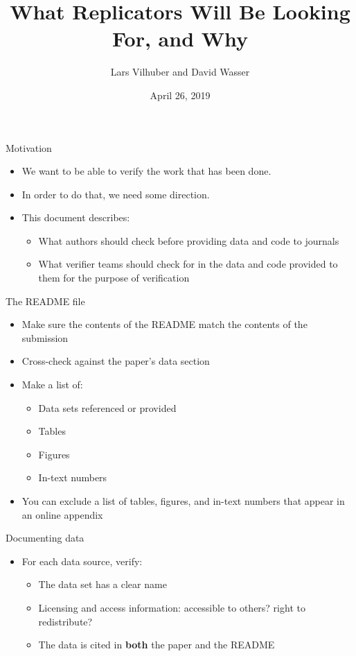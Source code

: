 \documentclass[xcolor={dvipsnames}]{beamer}
\title[Verification Guidance]{What Replicators Will Be Looking For, and Why}
\author{Lars Vilhuber and David Wasser}
\date{April 26, 2019}
\theoremstyle{definition}
\begin{document}
\makeatletter
\def\@listi{\leftmargin\leftmarginii \parsep .2em \itemsep 1em}
\def\@listii{\leftmargin\leftmarginii \topsep .2em \parsep .2em \itemsep .2em}
\makeatother

\begin{frame}[plain]
\titlepage
\addtocounter{framenumber}{-1}
\end{frame}

\begin{frame}{Motivation}
\begin{itemize}
    \item We want to be able to verify the work that has been done.
    \item In order to do that, we need some direction.
    \item This document describes:
    \begin{itemize}
        \item What authors should check before providing data and code to journals
        \item What verifier teams should check for in the data and code provided to them for the purpose of verification
    \end{itemize}
\end{itemize}
\end{frame}

\begin{frame}{The README file}
\begin{itemize}
    \item Make sure the contents of the README match the contents of the submission
    \item Cross-check against the paper's data section
    \item Make a list of:
    \begin{itemize}
        \pause 
        \item Data sets referenced or provided
        \pause
        \item Tables
        \item Figures
        \pause 
        \item In-text numbers
    \end{itemize}
    \pause
    \item You can exclude a list of tables, figures, and in-text numbers that appear in an online appendix
\end{itemize}
\end{frame}

\begin{frame}{Documenting data}
\begin{itemize}
    \item For each data source, verify:
    \begin{itemize}
        \item The data set has a clear name
        \item Licensing and access information: accessible to others? right to redistribute?
        \item The data is cited in \textbf{both} the paper and the README
    \end{itemize}
\end{itemize}
\end{frame}
\end{document}
